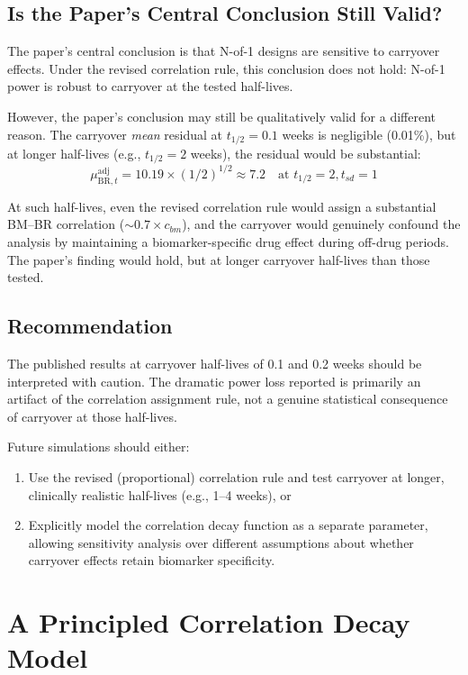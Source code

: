 \documentclass[11pt]{article}
\begin{document}
\subsection{Is the Paper's Central Conclusion Still Valid?}

The paper's central conclusion is that N-of-1 designs are
sensitive to carryover effects. Under the revised correlation
rule, this conclusion does not hold: N-of-1 power is robust
to carryover at the tested half-lives.

However, the paper's conclusion may still be qualitatively
valid for a different reason. The carryover \emph{mean}
residual at $t_{1/2} = 0.1$ weeks is negligible (0.01\%),
but at longer half-lives (e.g., $t_{1/2} = 2$ weeks), the
residual would be substantial:
\[
\mu_{\text{BR},t}^{\text{adj}} =
  10.19 \times (1/2)^{1/2} \approx 7.2
  \quad\text{at } t_{1/2} = 2, t_{sd} = 1
\]

At such half-lives, even the revised correlation rule would
assign a substantial BM--BR correlation ($\sim 0.7 \times
c_{bm}$), and the carryover would genuinely confound the
analysis by maintaining a biomarker-specific drug effect
during off-drug periods. The paper's finding would hold, but
at longer carryover half-lives than those tested.

\subsection{Recommendation}

The published results at carryover half-lives of 0.1 and 0.2
weeks should be interpreted with caution. The dramatic power
loss reported is primarily an artifact of the correlation
assignment rule, not a genuine statistical consequence of
carryover at those half-lives.

Future simulations should either:

\begin{enumerate}
\item Use the revised (proportional) correlation rule and
  test carryover at longer, clinically realistic half-lives
  (e.g., 1--4 weeks), or
\item Explicitly model the correlation decay function as a
  separate parameter, allowing sensitivity analysis over
  different assumptions about whether carryover effects
  retain biomarker specificity.
\end{enumerate}

\section{A Principled Correlation Decay Model}
\end{document}
